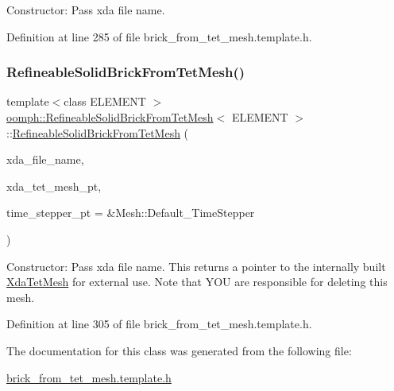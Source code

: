 Constructor\+: Pass xda file name. 



Definition at line 285 of file brick\+\_\+from\+\_\+tet\+\_\+mesh.\+template.\+h.

\mbox{\label{classoomph_1_1RefineableSolidBrickFromTetMesh_a178ef2547dfaa31b2f88e50b26315d00}} 
\subsubsection{\texorpdfstring{Refineable\+Solid\+Brick\+From\+Tet\+Mesh()}{RefineableSolidBrickFromTetMesh()}\hspace{0.1cm}{\footnotesize\ttfamily [2/2]}}
{\footnotesize\ttfamily template$<$class E\+L\+E\+M\+E\+NT $>$ \\
\hyperlink{classoomph_1_1RefineableSolidBrickFromTetMesh}{oomph\+::\+Refineable\+Solid\+Brick\+From\+Tet\+Mesh}$<$ E\+L\+E\+M\+E\+NT $>$\+::\hyperlink{classoomph_1_1RefineableSolidBrickFromTetMesh}{Refineable\+Solid\+Brick\+From\+Tet\+Mesh} (\begin{DoxyParamCaption}\item[{const std\+::string}]{xda\+\_\+file\+\_\+name,  }\item[{\hyperlink{classoomph_1_1XdaTetMesh}{Xda\+Tet\+Mesh}$<$ T\+Element$<$ 3, 3 $>$ $>$ $\ast$\&}]{xda\+\_\+tet\+\_\+mesh\+\_\+pt,  }\item[{Time\+Stepper $\ast$}]{time\+\_\+stepper\+\_\+pt = {\ttfamily \&Mesh\+:\+:Default\+\_\+TimeStepper} }\end{DoxyParamCaption})\hspace{0.3cm}{\ttfamily [inline]}}



Constructor\+: Pass xda file name. This returns a pointer to the internally built \hyperlink{classoomph_1_1XdaTetMesh}{Xda\+Tet\+Mesh} for external use. Note that Y\+OU are responsible for deleting this mesh. 



Definition at line 305 of file brick\+\_\+from\+\_\+tet\+\_\+mesh.\+template.\+h.



The documentation for this class was generated from the following file\+:\begin{DoxyCompactItemize}
\item 
\hyperlink{brick__from__tet__mesh_8template_8h}{brick\+\_\+from\+\_\+tet\+\_\+mesh.\+template.\+h}\end{DoxyCompactItemize}
